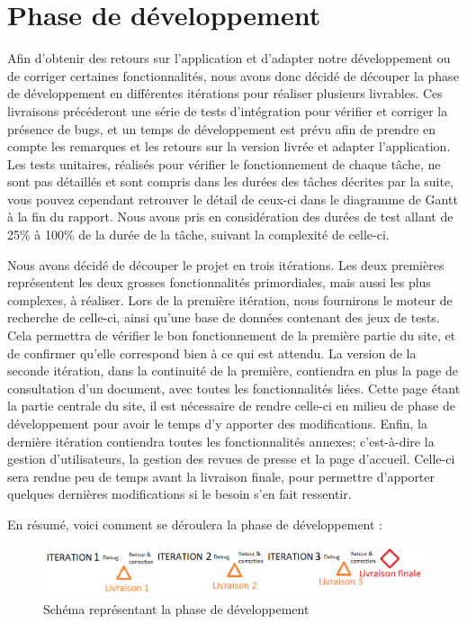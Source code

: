 \section{Phase de développement}
\label{sec:dev}

	Afin d'obtenir des retours sur l'application et d'adapter notre développement ou de corriger certaines fonctionnalités, nous avons donc décidé de découper la phase de développement en différentes itérations pour réaliser plusieurs livrables. Ces livraisons précéderont une série de tests d'intégration pour vérifier et corriger la présence de bugs, et un temps de développement est prévu afin de prendre en compte les remarques et les retours sur la version livrée et adapter l'application. Les tests unitaires, réalisés pour vérifier le fonctionnement de chaque tâche, ne sont pas détaillés et sont compris dans les durées des tâches décrites par la suite, vous pouvez cependant retrouver le détail de ceux-ci dans le diagramme de Gantt à la fin du rapport. Nous avons pris en considération des durées de test allant de 25\% à 100\% de la durée de la tâche, suivant la complexité de celle-ci.

	Nous avons décidé de découper le projet en trois itérations. Les deux premières représentent les deux grosses fonctionnalités primordiales, mais aussi les plus complexes, à réaliser. Lors de la première itération, nous fournirons le moteur de recherche de celle-ci, ainsi qu'une base de données contenant des jeux de tests. Cela permettra de vérifier le bon fonctionnement de la première partie du site, et de confirmer qu'elle correspond bien à ce qui est attendu. La version de la seconde itération, dans la continuité de la première, contiendra en plus la page de consultation d'un document, avec toutes les fonctionnalités liées. Cette page étant la partie centrale du site, il est nécessaire de rendre celle-ci en milieu de phase de développement pour avoir le temps d'y apporter des modifications. Enfin, la dernière itération contiendra toutes les fonctionnalités annexes; c'est-à-dire la gestion d'utilisateurs, la gestion des revues de presse et la page d'accueil. Celle-ci sera rendue peu de temps avant la livraison finale, pour permettre d'apporter quelques dernières modifications si le besoin s'en fait ressentir.

	En résumé, voici comment se déroulera la phase de développement :

	\begin{figure}[H]
        \centering
        \includegraphics[width=\textwidth]{figure/schema_developpement.png}
            \caption{Schéma représentant la phase de développement}
            \label{fig:sch_dev}
    \end{figure}